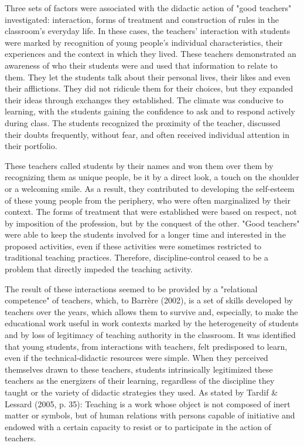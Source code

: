 \documentclass[11pt, a4paper]{article}
\begin{document}
Three sets of factors were associated with the didactic action of "good teachers" investigated: interaction, forms of
treatment and construction of rules in the classroom's everyday life. In these cases, the teachers' interaction with students
were marked by recognition of young people's individual characteristics, their experiences and the context in which they
lived. These teachers demonstrated an awareness of who their students were and used that information to relate to them.
They let the students talk about their personal lives, their likes and even their afflictions. They did not ridicule them for
their choices, but they expanded their ideas through exchanges they established. The climate was conducive to learning,
with the students gaining the confidence to ask and to respond actively during class. The students recognized the
proximity of the teacher, discussed their doubts frequently, without fear, and often received individual attention in their
portfolio.

These teachers called students by their names and won them over them by recognizing them as unique people, be it by a
direct look, a touch on the shoulder or a welcoming smile. As a result, they contributed to developing the self-esteem of
these young people from the periphery, who were often marginalized by their context. The forms of treatment that were
established were based on respect, not by imposition of the profession, but by the conquest of the other.
"Good teachers" were able to keep the students involved for a longer time and interested in the proposed activities, even if
these activities were sometimes restricted to traditional teaching practices. Therefore, discipline-control ceased to be a
problem that directly impeded the teaching activity.

The result of these interactions seemed to be provided by a "relational competence" of teachers, which, to Barrère (2002),
is a set of skills developed by teachers over the years, which allows them to survive and, especially, to make the
educational work useful in work contexts marked by the heterogeneity of students and by loss of legitimacy of teaching
authority in the classroom. It was identified that young students, from interactions with teachers, felt predisposed to learn,
even if the technical-didactic resources were simple. When they perceived themselves drawn to these teachers, students
intrinsically legitimized these teachers as the energizers of their learning, regardless of the discipline they taught or the
variety of didactic strategies they used. As stated by Tardif \& Lessard (2005, p. 35): Teaching is a work whose object is
not composed of inert matter or symbols, but of human relations with persons capable of initiative and endowed with a
certain capacity to resist or to participate in the action of teachers.
\end{document}
